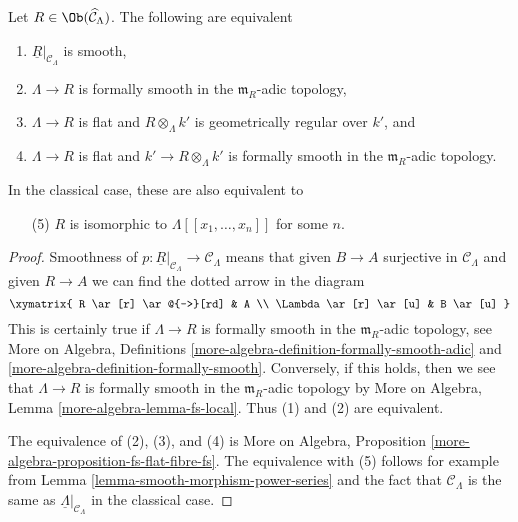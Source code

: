 \begin{lemma}
\label{lemma-smooth}
Let $R \in \Ob(\widehat{\mathcal{C}}_\Lambda)$. The following are
equivalent
\begin{enumerate}
\item $\underline{R}|_{\mathcal{C}_\Lambda}$ is smooth,
\item $\Lambda \to R$ is formally smooth in the $\mathfrak m_R$-adic topology,
\item $\Lambda \to R$ is flat and $R \otimes_\Lambda k'$ is
geometrically regular over $k'$, and
\item $\Lambda \to R$ is flat and $k' \to R \otimes_\Lambda k'$ is
formally smooth in the $\mathfrak m_R$-adic topology.
\end{enumerate}
In the classical case, these are also equivalent to
\begin{enumerate}
\item[(5)] $R$ is isomorphic to $\Lambda[[x_1, \ldots, x_n]]$
for some $n$.
\end{enumerate}
\end{lemma}

\begin{proof}
Smoothness of
$p : \underline{R}|_{\mathcal{C}_\Lambda} \to \mathcal{C}_\Lambda$
means that given $B \to A$ surjective in $\mathcal{C}_\Lambda$
and given $R \to A$ we can find the dotted arrow in the
diagram
$$
\xymatrix{
R \ar[r] \ar@{-->}[rd] & A \\
\Lambda \ar[r] \ar[u] & B \ar[u]
}
$$
This is certainly true if $\Lambda \to R$ is formally smooth in the
$\mathfrak m_R$-adic topology, see
More on Algebra, Definitions
\ref{more-algebra-definition-formally-smooth-adic} and
\ref{more-algebra-definition-formally-smooth}.
Conversely, if this holds, then we see that
$\Lambda \to R$ is formally smooth in the $\mathfrak m_R$-adic
topology by More on Algebra, Lemma \ref{more-algebra-lemma-fs-local}.
Thus (1) and (2) are equivalent.

\medskip\noindent
The equivalence of (2), (3), and (4) is
More on Algebra, Proposition \ref{more-algebra-proposition-fs-flat-fibre-fs}.
The equivalence with (5) follows for example from
Lemma \ref{lemma-smooth-morphism-power-series}
and the fact that $\mathcal{C}_\Lambda$ is the same
as $\underline{\Lambda}|_{\mathcal{C}_\Lambda}$ in the classical case.
\end{proof}


